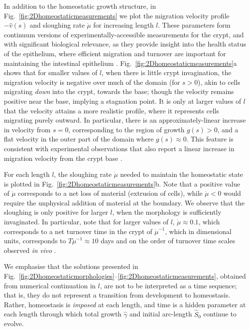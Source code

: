 In addition to the homeostatic growth structure, in Fig.\ \ref{fig:2Dhomeostaticmeasurements} we plot the migration velocity profile $-\hat{v}(s)$ and sloughing rate $\dot\mu$ for increasing length $l$. These parameters form continuum versions of experimentally-accessible measurements for the crypt, and with significant biological relevance, as they provide insight into the health status of the epithelium, where efficient migration and turnover are important for maintaining the intestinal epithelium \cite{potten1997regulation, sansom2004loss}. Fig.\ \ref{fig:2Dhomeostaticmeasurements}a shows that for smaller values of $l$, when there is little crypt invagination, the migration velocity is negative over much of the domain (for $s>0$), akin to cells migrating \emph{down} into the crypt, towards the base; though the velocity remains positive near the base, implying a stagnation point. It is only at larger values of $l$ that the velocity attains a more realistic profile, where it represents cells migrating purely outward. In particular, there is an approximately-linear increase in velocity from $s = 0$, corresponding to the region of growth $g(s)>0$, and a flat velocity in the outer part of the domain where $g(s)\approx0$. This feature is consistent with experimental observations that also report a linear increase in migration velocity from the crypt base \cite{kaur1986cell, krndija2019active}. 

For each length $l$, the sloughing rate $\dot\mu$ needed to maintain the homeostatic state is plotted in Fig.\ \ref{fig:2Dhomeostaticmeasurements}b. Note that a positive value of $\dot\mu$ corresponds to a net loss of material (extrusion of cells), while $\dot\mu<0$ would require the unphysical addition of material at the boundary. We observe that the sloughing is only positive for larger $l$, when the morphology is sufficiently invaginated. In particular, note that for larger values of $l$, $\dot{\mu} \approx 0.1$, which corresponds to a net turnover time in the crypt of $\dot{\mu}^{-1}$, which in dimensional units, corresponds to $T\dot{\mu}^{-1} \approx 10$ days and on the order of turnover time scales observed \emph{in vivo} \cite{gehart2018tales}.

We emphasise that the solutions presented in Fig.\ \ref{fig:2Dhomeostaticmorphologies}--\ref{fig:2Dhomeostaticmeasurements}, obtained from numerical continuation in $l$, are not to be interpreted as a time sequence; that is, they do not represent a transition from development to homeostasis. Rather, homeostasis is \emph{imposed} at each length, and time is a hidden parameter at each length through which total growth $\hat\gamma$ and initial arc-length $\hat S_0$ continue to evolve. 


